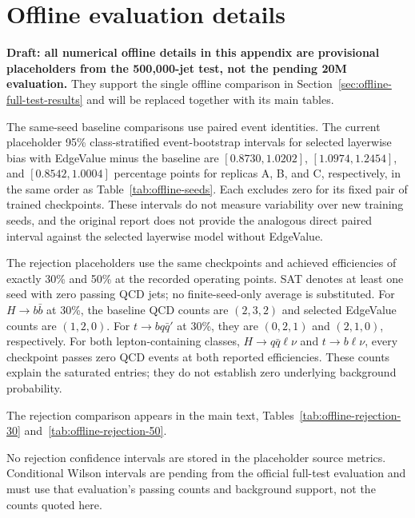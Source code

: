 \section{Offline evaluation details}
\label{sec:offline-details}

\noindent\textbf{Draft: all numerical offline details in this appendix are
provisional placeholders from the 500,000-jet test, not the pending 20M
evaluation.} They support the single offline comparison in
Section~\ref{sec:offline-full-test-results} and will be replaced together
with its main tables.

The same-seed baseline comparisons use paired event identities. The current
placeholder 95\% class-stratified event-bootstrap intervals for selected
layerwise bias with EdgeValue minus the baseline
are $[0.8730,1.0202]$, $[1.0974,1.2454]$, and $[0.8542,1.0004]$
percentage points for replicas A, B, and C, respectively, in the same
order as Table~\ref{tab:offline-seeds}. Each excludes
zero for its fixed pair of trained checkpoints. These intervals do not
measure variability over new training seeds, and the original report does
not provide the analogous direct paired interval against the selected
layerwise model without EdgeValue.



The rejection placeholders use the same checkpoints and achieved efficiencies
of exactly 30\% and 50\% at the recorded operating points. SAT denotes at
least one seed with zero passing QCD jets; no finite-seed-only average is
substituted. For $H\to b\bar b$ at 30\%, the baseline QCD counts are
$(2,3,2)$ and selected EdgeValue counts are $(1,2,0)$. For
$t\to bq\bar q'$ at 30\%, they are $(0,2,1)$ and $(2,1,0)$,
respectively. For both lepton-containing classes, $H\to q\bar q\ell\nu$ and
$t\to b\ell\nu$, every checkpoint passes zero QCD events at both reported
efficiencies. These counts explain the saturated entries; they do not
establish zero underlying background probability.

The rejection comparison appears in the main text,
Tables~\ref{tab:offline-rejection-30} and~\ref{tab:offline-rejection-50}.

No rejection confidence intervals are stored in the placeholder source
metrics. Conditional Wilson intervals are pending from the official
full-test evaluation and must use that evaluation's passing counts and
background support, not the counts quoted here.
